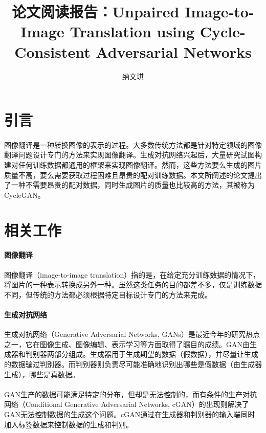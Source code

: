 \documentclass[12pt,a4paper]{article}
\begin{document}

\title{论文阅读报告：Unpaired Image-to-Image Translation using Cycle-Consistent Adversarial Networks \cite{cyclegan}}

\author[*]{纳文琪}
\date{}
\maketitle
\section{引言}

\paragraph{} 图像翻译是一种转换图像的表示的过程。大多数传统方法都是针对特定领域的图像翻译问题设计专门的方法来实现图像翻译。生成对抗网络兴起后，大量研究试图构建对任何训练数据都通用的框架来实现图像翻译。然而，这些方法要么生成的图片质量不高，要么需要获取过程困难且昂贵的配对训练数据。本文所阐述的论文提出了一种不需要昂贵的配对数据，同时生成图片的质量也比较高的方法，其被称为CycleGAN。
\section{相关工作}
\paragraph{图像翻译} 图像翻译（image-to-image translation）指的是，在给定充分训练数据的情况下，将图片的一种表示转换成另外一种。虽然这类任务的目的都差不多，仅是训练数据不同，但传统的方法都必须根据特定目标设计专门的方法来完成。
\paragraph{生成对抗网络} 生成对抗网络（Generative Adversarial Networks, GANs）是最近今年的研究热点之一，它在图像生成、图像编辑、表示学习等方面取得了瞩目的成绩。GAN由生成器和判别器两部分组成。生成器用于生成期望的数据（假数据），并尽量让生成的数据骗过判别器。而判别器则负责尽可能准确地识别出哪些是假数据（由生成器生成），哪些是真数据。
\paragraph{} GAN生产的数据可能满足特定的分布，但却是无法控制的，而有条件的生产对抗网络（Conditional Generative Adversarial Networks, cGAN）的出现则解决了GAN无法控制数据的生成这个问题。cGAN通过在生成器和判别器的输入端同时加入标签数据来控制数据的生成和判别。
\end{document}
